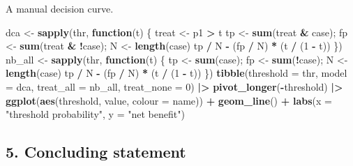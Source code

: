 \documentclass[
]{article}
\newenvironment{Shaded}{\begin{snugshade}}{\end{snugshade}}
\newcommand{\AttributeTok}[1]{\textcolor[rgb]{0.13,0.29,0.53}{#1}}
\newcommand{\ControlFlowTok}[1]{\textcolor[rgb]{0.13,0.29,0.53}{\textbf{#1}}}
\newcommand{\DecValTok}[1]{\textcolor[rgb]{0.00,0.00,0.81}{#1}}
\newcommand{\FunctionTok}[1]{\textcolor[rgb]{0.13,0.29,0.53}{\textbf{#1}}}
\newcommand{\NormalTok}[1]{#1}
\newcommand{\OtherTok}[1]{\textcolor[rgb]{0.56,0.35,0.01}{#1}}
\newcommand{\SpecialCharTok}[1]{\textcolor[rgb]{0.81,0.36,0.00}{\textbf{#1}}}
\newcommand{\StringTok}[1]{\textcolor[rgb]{0.31,0.60,0.02}{#1}}
\begin{document}
A manual decision curve.

\begin{Shaded}
\begin{Highlighting}[]
\NormalTok{dca }\OtherTok{\textless{}{-}} \FunctionTok{sapply}\NormalTok{(thr, }\ControlFlowTok{function}\NormalTok{(t) \{}
\NormalTok{  treat }\OtherTok{\textless{}{-}}\NormalTok{ p1 }\SpecialCharTok{\textgreater{}}\NormalTok{ t}
\NormalTok{  tp }\OtherTok{\textless{}{-}} \FunctionTok{sum}\NormalTok{(treat }\SpecialCharTok{\&}\NormalTok{  case); fp }\OtherTok{\textless{}{-}} \FunctionTok{sum}\NormalTok{(treat }\SpecialCharTok{\&} \SpecialCharTok{!}\NormalTok{case); N }\OtherTok{\textless{}{-}} \FunctionTok{length}\NormalTok{(case)}
\NormalTok{  tp }\SpecialCharTok{/}\NormalTok{ N }\SpecialCharTok{{-}}\NormalTok{ (fp }\SpecialCharTok{/}\NormalTok{ N) }\SpecialCharTok{*}\NormalTok{ (t }\SpecialCharTok{/}\NormalTok{ (}\DecValTok{1} \SpecialCharTok{{-}}\NormalTok{ t))}
\NormalTok{\})}
\NormalTok{nb\_all }\OtherTok{\textless{}{-}} \FunctionTok{sapply}\NormalTok{(thr, }\ControlFlowTok{function}\NormalTok{(t) \{}
\NormalTok{  tp }\OtherTok{\textless{}{-}} \FunctionTok{sum}\NormalTok{(case); fp }\OtherTok{\textless{}{-}} \FunctionTok{sum}\NormalTok{(}\SpecialCharTok{!}\NormalTok{case); N }\OtherTok{\textless{}{-}} \FunctionTok{length}\NormalTok{(case)}
\NormalTok{  tp }\SpecialCharTok{/}\NormalTok{ N }\SpecialCharTok{{-}}\NormalTok{ (fp }\SpecialCharTok{/}\NormalTok{ N) }\SpecialCharTok{*}\NormalTok{ (t }\SpecialCharTok{/}\NormalTok{ (}\DecValTok{1} \SpecialCharTok{{-}}\NormalTok{ t))}
\NormalTok{\})}
\FunctionTok{tibble}\NormalTok{(}\AttributeTok{threshold =}\NormalTok{ thr, }\AttributeTok{model =}\NormalTok{ dca, }\AttributeTok{treat\_all =}\NormalTok{ nb\_all, }\AttributeTok{treat\_none =} \DecValTok{0}\NormalTok{) }\SpecialCharTok{|\textgreater{}}
  \FunctionTok{pivot\_longer}\NormalTok{(}\SpecialCharTok{{-}}\NormalTok{threshold) }\SpecialCharTok{|\textgreater{}}
  \FunctionTok{ggplot}\NormalTok{(}\FunctionTok{aes}\NormalTok{(threshold, value, }\AttributeTok{colour =}\NormalTok{ name)) }\SpecialCharTok{+} \FunctionTok{geom\_line}\NormalTok{() }\SpecialCharTok{+}
  \FunctionTok{labs}\NormalTok{(}\AttributeTok{x =} \StringTok{"threshold probability"}\NormalTok{, }\AttributeTok{y =} \StringTok{"net benefit"}\NormalTok{)}
\end{Highlighting}
\end{Shaded}

\subsection{5. Concluding statement}\label{concluding-statement}
\end{document}
